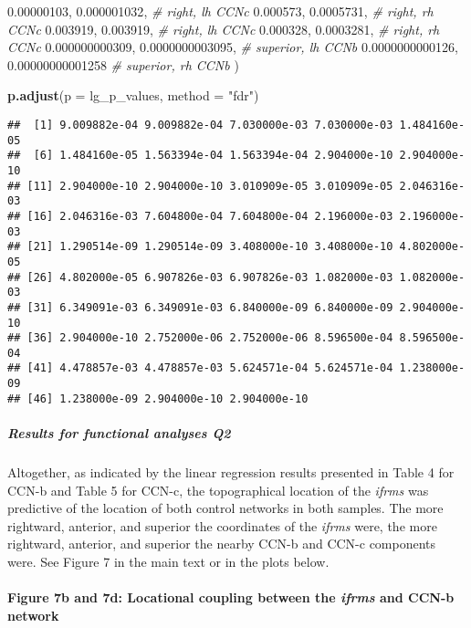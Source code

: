 \documentclass[
]{article}
\newenvironment{Shaded}{\begin{snugshade}}{\end{snugshade}}
\newcommand{\CommentTok}[1]{\textcolor[rgb]{0.56,0.35,0.01}{\textit{#1}}}
\newcommand{\DataTypeTok}[1]{\textcolor[rgb]{0.13,0.29,0.53}{#1}}
\newcommand{\FloatTok}[1]{\textcolor[rgb]{0.00,0.00,0.81}{#1}}
\newcommand{\KeywordTok}[1]{\textcolor[rgb]{0.13,0.29,0.53}{\textbf{#1}}}
\newcommand{\NormalTok}[1]{#1}
\newcommand{\StringTok}[1]{\textcolor[rgb]{0.31,0.60,0.02}{#1}}
\begin{document}
\begin{Shaded}
\begin{Highlighting}[]
                 \FloatTok{0.00000103}\NormalTok{, }\FloatTok{0.000001032}\NormalTok{, }\CommentTok{# right, lh CCNc}
                 \FloatTok{0.000573}\NormalTok{, }\FloatTok{0.0005731}\NormalTok{, }\CommentTok{# right, rh CCNc}
                 \FloatTok{0.003919}\NormalTok{, }\FloatTok{0.003919}\NormalTok{, }\CommentTok{# right, lh CCNc}
                 \FloatTok{0.000328}\NormalTok{, }\FloatTok{0.0003281}\NormalTok{, }\CommentTok{# right, rh CCNc}
                 \FloatTok{0.000000000309}\NormalTok{, }\FloatTok{0.0000000003095}\NormalTok{, }\CommentTok{# superior, lh CCNb}
                 \FloatTok{0.0000000000126}\NormalTok{, }\FloatTok{0.00000000001258} \CommentTok{# superior, rh CCNb}
\NormalTok{)}

\KeywordTok{p.adjust}\NormalTok{(}\DataTypeTok{p =}\NormalTok{ lg_p_values,}
  \DataTypeTok{method =} \StringTok{"fdr"}\NormalTok{)}
\end{Highlighting}
\end{Shaded}

\begin{verbatim}
##  [1] 9.009882e-04 9.009882e-04 7.030000e-03 7.030000e-03 1.484160e-05
##  [6] 1.484160e-05 1.563394e-04 1.563394e-04 2.904000e-10 2.904000e-10
## [11] 2.904000e-10 2.904000e-10 3.010909e-05 3.010909e-05 2.046316e-03
## [16] 2.046316e-03 7.604800e-04 7.604800e-04 2.196000e-03 2.196000e-03
## [21] 1.290514e-09 1.290514e-09 3.408000e-10 3.408000e-10 4.802000e-05
## [26] 4.802000e-05 6.907826e-03 6.907826e-03 1.082000e-03 1.082000e-03
## [31] 6.349091e-03 6.349091e-03 6.840000e-09 6.840000e-09 2.904000e-10
## [36] 2.904000e-10 2.752000e-06 2.752000e-06 8.596500e-04 8.596500e-04
## [41] 4.478857e-03 4.478857e-03 5.624571e-04 5.624571e-04 1.238000e-09
## [46] 1.238000e-09 2.904000e-10 2.904000e-10
\end{verbatim}

\hypertarget{results-for-functional-analyses-q2}{%
\subparagraph{Results for functional analyses
Q2}\label{results-for-functional-analyses-q2}}

Altogether, as indicated by the linear regression results presented in
Table 4 for CCN-b and Table 5 for CCN-c, the topographical location of
the \emph{ifrms} was predictive of the location of both control networks
in both samples. The more rightward, anterior, and superior the
coordinates of the \emph{ifrms} were, the more rightward, anterior, and
superior the nearby CCN-b and CCN-c components were. See Figure 7 in the
main text or in the plots below.

\hypertarget{figure-7b-and-7d-locational-coupling-between-the-ifrms-and-ccn-b-network}{%
\paragraph{\texorpdfstring{Figure 7b and 7d: Locational coupling between
the \emph{ifrms} and CCN-b
network}{Figure 7b and 7d: Locational coupling between the ifrms and CCN-b network}}\label{figure-7b-and-7d-locational-coupling-between-the-ifrms-and-ccn-b-network}}
\end{document}
